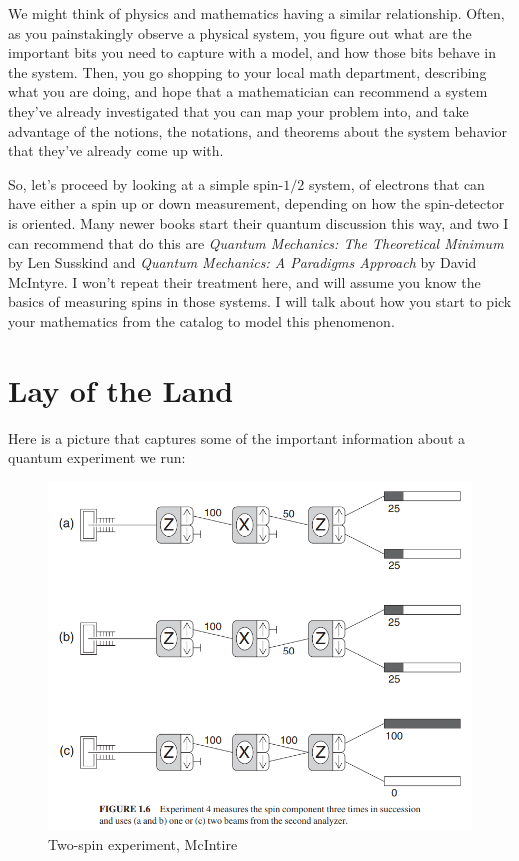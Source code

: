 \documentclass[
]{book}
\begin{document}
We might think of physics and mathematics having a similar relationship. Often, as you painstakingly observe a physical system, you figure out what are the important bits you need to capture with a model, and how those bits behave in the system. Then, you go shopping to your local math department, describing what you are doing, and hope that a mathematician can recommend a system they've already investigated that you can map your problem into, and take advantage of the notions, the notations, and theorems about the system behavior that they've already come up with.

So, let's proceed by looking at a simple spin-\(1/2\) system, of electrons that can have either a spin up or down measurement, depending on how the spin-detector is oriented. Many newer books start their quantum discussion this way, and two I can recommend that do this are \emph{Quantum Mechanics: The Theoretical Minimum} by Len Susskind and \emph{Quantum Mechanics: A Paradigms Approach} by David McIntyre. I won't repeat their treatment here, and will assume you know the basics of measuring spins in those systems. I will talk about how you start to pick your mathematics from the catalog to model this phenomenon.

\hypertarget{lay-of-the-land}{%
\section{Lay of the Land}\label{lay-of-the-land}}

Here is a picture that captures some of the important information about a quantum experiment we run:

\begin{figure}

{\centering \includegraphics[width=0.75\linewidth,height=0.75\textheight]{images/McIntyre_two-spin-experiment} 

}

\caption{Two-spin experiment, McIntire}\label{fig:unnamed-chunk-5}
\end{figure}
\end{document}
